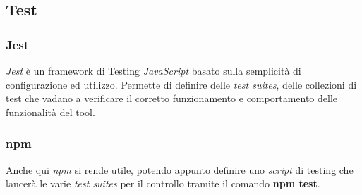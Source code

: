 \documentclass[twoside]{supsistudent}
\begin{document}
\subsection{Test}

\subsubsection{Jest}

\textit{Jest} è un framework di Testing \textit{JavaScript} basato sulla
semplicità di configurazione ed utilizzo. Permette di definire delle 
\textit{test suites}, delle collezioni di test che vadano a verificare il
corretto funzionamento e comportamento delle funzionalità del tool.

\subsubsection{npm}

Anche qui \textit{npm} si rende utile, potendo appunto definire uno
\textit{script} di testing che lancerà le varie \textit{test suites} per il
controllo tramite il comando \textbf{npm test}.



%
\end{document}
